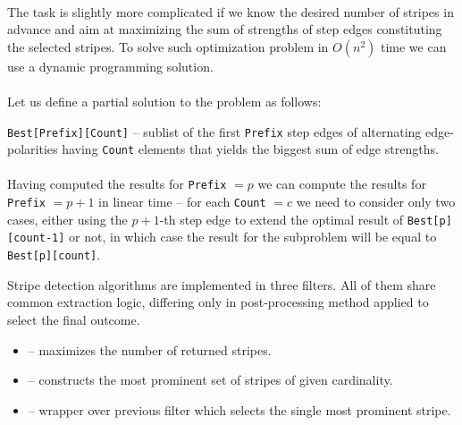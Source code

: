 \paragraph*{}
The task is slightly more complicated if we know the desired number of stripes in advance and aim at maximizing the sum of strengths of step edges constituting the selected stripes. To solve such optimization problem in $O(n^2)$ time we can use a dynamic programming solution.

\paragraph*{}
Let us define a partial solution to the problem as follows:
\begin{description}
	\item \texttt{Best[Prefix][Count]} -- sublist of the first \texttt{Prefix} step edges of alternating edge-polarities having \texttt{Count} elements that yields the biggest sum of edge strengths.
\end{description}

\paragraph*{}
Having computed the results for \texttt{Prefix} $=p$ we can compute the results for \texttt{Prefix} $=p+1$ in linear time -- for each \texttt{Count} $=c$ we need to consider only two cases, either using the $p+1$-th step edge to extend the optimal result of \texttt{Best[p][count-1]} or not, in which case the result for the subproblem will be equal to \texttt{Best[p][count]}.

\begin{refImpl}
Stripe detection algorithms are implemented in three \studio filters. All of them share common extraction logic, differing only in post-processing method applied to select the final outcome.
\begin{itemize}
	\item {} -- maximizes the number of returned stripes.
	\item {} -- constructs the most prominent set of stripes of given cardinality.
	\item {} -- wrapper over previous filter which selects the single most prominent stripe.
\end{itemize} 
\end{refImpl}
